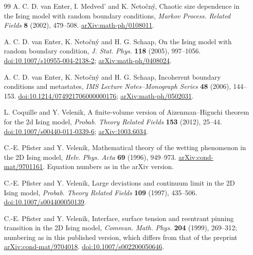 {}
\begin{thebibliography}{99}
A. C. D. van Enter, I. Medved' and K. Neto\v cn\'y,
Chaotic size dependence in the Ising model with random boundary conditions,
\emph{Markov Process. Related Fields} \textbf{8} (2002), 479--508.
\href{https://arxiv.org/abs/math-ph/0108011}{arXiv:math-ph/0108011}.

A. C. D. van Enter, K. Neto\v cn\'y and H. G. Schaap,
On the Ising model with random boundary condition,
\emph{J. Stat. Phys.} \textbf{118} (2005), 997--1056.
\href{https://doi.org/10.1007/s10955-004-2138-2}{doi:10.1007/s10955-004-2138-2};
\href{https://arxiv.org/abs/math-ph/0408024}{arXiv:math-ph/0408024}.

A. C. D. van Enter, K. Neto\v cn\'y and H. G. Schaap,
Incoherent boundary conditions and metastates,
\emph{IMS Lecture Notes--Monograph Series} \textbf{48} (2006), 144--153.
\href{https://doi.org/10.1214/074921706000000176}{doi:10.1214/074921706000000176};
\href{https://arxiv.org/abs/math-ph/0502031}{arXiv:math-ph/0502031}.

L. Coquille and Y. Velenik,
A finite-volume version of Aizenman--Higuchi theorem for the 2d Ising model,
\emph{Probab. Theory Related Fields} \textbf{153} (2012), 25--44.
\href{https://doi.org/10.1007/s00440-011-0339-6}{doi:10.1007/s00440-011-0339-6};
\href{https://arxiv.org/abs/1003.6034}{arXiv:1003.6034}.

C.-E. Pfister and Y. Velenik,
Mathematical theory of the wetting phenomenon in the 2D Ising model,
\emph{Helv. Phys. Acta} \textbf{69} (1996), 949--973.
\href{https://arxiv.org/abs/cond-mat/9701161}{arXiv:cond-mat/9701161}. Equation numbers as in the arXiv version.

C.-E. Pfister and Y. Velenik,
Large deviations and continuum limit in the 2D Ising model,
\emph{Probab. Theory Related Fields} \textbf{109} (1997), 435--506.
\href{https://doi.org/10.1007/s004400050139}{doi:10.1007/s004400050139}.

C.-E. Pfister and Y. Velenik,
Interface, surface tension and reentrant pinning transition in the 2D Ising model,
\emph{Commun. Math. Phys.} \textbf{204} (1999), 269--312; numbering as in this published version, which differs from that of the preprint \href{https://arxiv.org/abs/cond-mat/9704018}{arXiv:cond-mat/9704018}.
\href{https://doi.org/10.1007/s002200050646}{doi:10.1007/s002200050646}.


\end{thebibliography}

